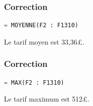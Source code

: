 \documentclass[svgnames,11pt]{beamer}
\begin{document}
\begin{frame}[fragile]
    \frametitle{Correction}

    \begin{center}
    \begin{lstlisting}[language=Python , basicstyle=\small, xleftmargin=2em, xrightmargin=2em]
= MOYENNE(F2 : F1310)
\end{lstlisting}
    \label{age}
    \end{center}
Le tarif moyen est 33,36£.
\end{frame}
\begin{frame}[fragile]
    \frametitle{Correction}

    \begin{center}
    \begin{lstlisting}[language=Python , basicstyle=\small, xleftmargin=2em, xrightmargin=2em]
= MAX(F2 : F1310)
\end{lstlisting}
    \label{age}
    \end{center}
Le tarif maximum est 512£.
\end{frame}
\end{document}
